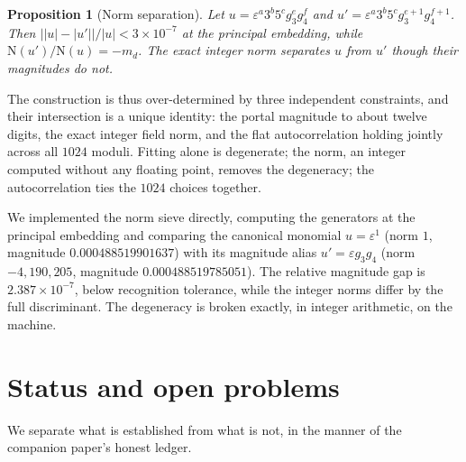 \documentclass[12pt,a4paper]{article}
\newtheorem{proposition}[theorem]{Proposition}
\newcommand{\md}{m_d}
\newcommand{\Norm}{\mathrm{N}}
\begin{document}
\begin{proposition}[Norm separation]
\label{prop:sieve}
Let $u = \varepsilon^{a}3^{b}5^{c}g_3^{e}g_4^{f}$ and
$u' = \varepsilon^{a}3^{b}5^{c}g_3^{e+1}g_4^{f+1}$. Then
$\big||u|-|u'|\big|/|u| < 3\times 10^{-7}$ at the principal embedding, while
$\Norm(u')/\Norm(u) = -\md$. The exact integer norm separates $u$ from $u'$
though their magnitudes do not.
\end{proposition}

The construction is thus over-determined by three independent constraints, and
their intersection is a unique identity: the portal magnitude to about twelve
digits, the exact integer field norm, and the flat autocorrelation holding
jointly across all $1024$ moduli. Fitting alone is degenerate; the norm, an
integer computed without any floating point, removes the degeneracy; the
autocorrelation ties the $1024$ choices together.

We implemented the norm sieve directly, computing the generators at the
principal embedding and comparing the canonical monomial
$u=\varepsilon^{1}$ (norm $1$, magnitude $0.000488519901637$) with its
magnitude alias $u'=\varepsilon g_3 g_4$ (norm $-4{,}190{,}205$, magnitude
$0.000488519785051$). The relative magnitude gap is $2.387\times 10^{-7}$, below
recognition tolerance, while the integer norms differ by the full discriminant.
The degeneracy is broken exactly, in integer arithmetic, on the machine.

\section{Status and open problems}
\label{sec:status}

We separate what is established from what is not, in the manner of the companion
paper's honest ledger.
\end{document}
